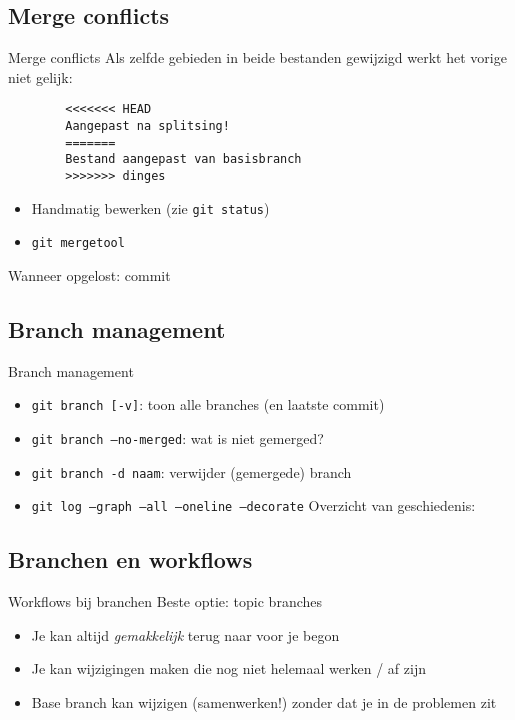 \subsection{Merge conflicts}
\begin{frame}[fragile]{Merge conflicts}
	Als zelfde gebieden in beide bestanden gewijzigd werkt het vorige niet gelijk:
	\begin{verbatim}
		<<<<<<< HEAD
		Aangepast na splitsing!
		=======
		Bestand aangepast van basisbranch
		>>>>>>> dinges
	\end{verbatim}
	\begin{itemize}
		\item Handmatig bewerken (zie \texttt{git status})
		\item \texttt{git mergetool}
	\end{itemize}
	Wanneer opgelost: commit
\end{frame}

\subsection{Branch management}
\begin{frame}{Branch management}
	\begin{itemize}
		\item \texttt{git branch [-v]}: toon alle branches (en laatste commit)
		\item \texttt{git branch --no-merged}: wat is niet gemerged?
		\item \texttt{git branch -d naam}: verwijder (gemergede) branch
		\item \texttt{git log --graph --all --oneline --decorate} Overzicht van geschiedenis:
	\end{itemize}
\end{frame}

\subsection{Branchen en workflows}
\begin{frame}{Workflows bij branchen}
	\alert{Beste optie: topic branches}
	\begin{itemize}
		\item Je kan altijd \emph{gemakkelijk} terug naar voor je begon
		\item Je kan wijzigingen maken die nog niet helemaal werken / af zijn
		\item Base branch kan wijzigen (samenwerken!) zonder dat je in de problemen zit
	\end{itemize}
\end{frame}
